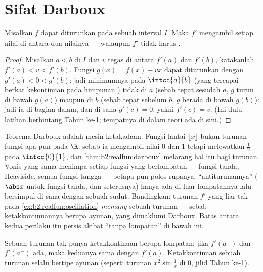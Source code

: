 \section{Sifat Darboux}

\begin{theorem}[Darboux]\label{thm:b2:realfun:darboux}
Misalkan $f$ dapat diturunkan pada sebuah interval $I$. Maka $f'$
mengambil setiap nilai di antara dua nilainya --- walaupun $f'$ tidak
harus .
\end{theorem}

\begin{proof}
Misalkan $a < b$ di $I$ dan $v$ tegas di antara $f'(a)$ dan $f'(b)$,
katakanlah $f'(a) < v < f'(b)$. Fungsi $g(x) = f(x) - vx$ dapat
diturunkan dengan $g'(a) < 0 < g'(b)$: jadi minimumnya pada
$\intcc{a}{b}$ (yang tercapai berkat kekontinuan pada himpunan )
tidak di $a$ (sebab tepat sesudah $a$, $g$ turun di bawah $g(a)$) maupun
di $b$ (sebab tepat sebelum $b$, $g$ berada di bawah $g(b)$): jadi ia di
bagian dalam, dan di sana $g'(c) = 0$, yakni $f'(c) = v$. (Ini dulu
latihan berbintang Tahun ke-1; tempatnya di dalam teori ada di sini.)
\end{proof}

\begin{example}\label{ex:b2:realfun:whichderivatives}
Teorema Darboux adalah mesin ketakadaan. Fungsi lantai
$\lfloor x\rfloor$ bukan turunan fungsi apa pun pada
$\R$: sebab ia mengambil nilai $0$ dan $1$ tetapi melewatkan $\frac12$
pada $\intcc{0}{1}$, dan \cref{thm:b2:realfun:darboux} melarang hal itu
bagi turunan. Vonis yang sama menimpa setiap fungsi yang berlompatan
--- fungsi tanda, Heaviside, semua fungsi tangga --- betapa pun polos
rupanya; ``antiturunannya'' ($\abs x$ untuk fungsi tanda, dan
seterusnya) hanya ada di luar lompatannya lalu bersimpul di sana dengan
sebuah sudut. Bandingkan: turunan $f'$ yang liar tak  pada
\cref{ex:b2:realfun:oscillation} \emph{memang} sebuah turunan --- sebab
ketakkontinuannya berupa ayunan, yang dimaklumi Darboux. Batas
antara kedua perilaku itu persis akibat ``tanpa lompatan'' di bawah ini.
\end{example}

\begin{corollary}\label{cor:b2:realfun:nojumps}
Sebuah turunan tak punya ketakkontinuan berupa lompatan: jika $f'(a^-)$
dan $f'(a^+)$ ada, maka keduanya sama dengan $f'(a)$. Ketakkontinuan
sebuah turunan selalu bertipe ayunan (seperti turunan
$x^2\sin\frac1x$ di $0$, jilid Tahun ke-1).
\end{corollary}

